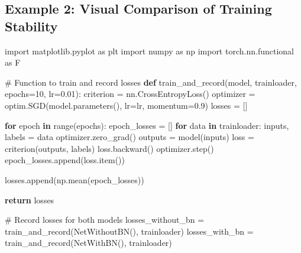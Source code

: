 \documentclass[
  letterpaper,
  DIV=11,
  numbers=noendperiod]{scrreprt}
\newenvironment{Shaded}{\begin{snugshade}}{\end{snugshade}}
\newcommand{\BuiltInTok}[1]{\textcolor[rgb]{0.00,0.23,0.31}{#1}}
\newcommand{\CommentTok}[1]{\textcolor[rgb]{0.37,0.37,0.37}{#1}}
\newcommand{\ControlFlowTok}[1]{\textcolor[rgb]{0.00,0.23,0.31}{\textbf{#1}}}
\newcommand{\DecValTok}[1]{\textcolor[rgb]{0.68,0.00,0.00}{#1}}
\newcommand{\FloatTok}[1]{\textcolor[rgb]{0.68,0.00,0.00}{#1}}
\newcommand{\ImportTok}[1]{\textcolor[rgb]{0.00,0.46,0.62}{#1}}
\newcommand{\KeywordTok}[1]{\textcolor[rgb]{0.00,0.23,0.31}{\textbf{#1}}}
\newcommand{\NormalTok}[1]{\textcolor[rgb]{0.00,0.23,0.31}{#1}}
\newcommand{\OperatorTok}[1]{\textcolor[rgb]{0.37,0.37,0.37}{#1}}
\begin{document}
\subsection{Example 2: Visual Comparison of Training
Stability}\label{example-2-visual-comparison-of-training-stability}

\begin{Shaded}
\begin{Highlighting}[]
\ImportTok{import}\NormalTok{ matplotlib.pyplot }\ImportTok{as}\NormalTok{ plt}
\ImportTok{import}\NormalTok{ numpy }\ImportTok{as}\NormalTok{ np}
\ImportTok{import}\NormalTok{ torch.nn.functional }\ImportTok{as}\NormalTok{ F}

\CommentTok{\# Function to train and record losses}
\KeywordTok{def}\NormalTok{ train\_and\_record(model, trainloader, epochs}\OperatorTok{=}\DecValTok{10}\NormalTok{, lr}\OperatorTok{=}\FloatTok{0.01}\NormalTok{):}
\NormalTok{    criterion }\OperatorTok{=}\NormalTok{ nn.CrossEntropyLoss()}
\NormalTok{    optimizer }\OperatorTok{=}\NormalTok{ optim.SGD(model.parameters(), lr}\OperatorTok{=}\NormalTok{lr, momentum}\OperatorTok{=}\FloatTok{0.9}\NormalTok{)}
\NormalTok{    losses }\OperatorTok{=}\NormalTok{ []}
    
    \ControlFlowTok{for}\NormalTok{ epoch }\KeywordTok{in} \BuiltInTok{range}\NormalTok{(epochs):}
\NormalTok{        epoch\_losses }\OperatorTok{=}\NormalTok{ []}
        \ControlFlowTok{for}\NormalTok{ data }\KeywordTok{in}\NormalTok{ trainloader:}
\NormalTok{            inputs, labels }\OperatorTok{=}\NormalTok{ data}
\NormalTok{            optimizer.zero\_grad()}
\NormalTok{            outputs }\OperatorTok{=}\NormalTok{ model(inputs)}
\NormalTok{            loss }\OperatorTok{=}\NormalTok{ criterion(outputs, labels)}
\NormalTok{            loss.backward()}
\NormalTok{            optimizer.step()}
\NormalTok{            epoch\_losses.append(loss.item())}
        
\NormalTok{        losses.append(np.mean(epoch\_losses))}
    
    \ControlFlowTok{return}\NormalTok{ losses}

\CommentTok{\# Record losses for both models}
\NormalTok{losses\_without\_bn }\OperatorTok{=}\NormalTok{ train\_and\_record(NetWithoutBN(), trainloader)}
\NormalTok{losses\_with\_bn }\OperatorTok{=}\NormalTok{ train\_and\_record(NetWithBN(), trainloader)}


\end{Highlighting}
\end{Shaded}
\end{document}
